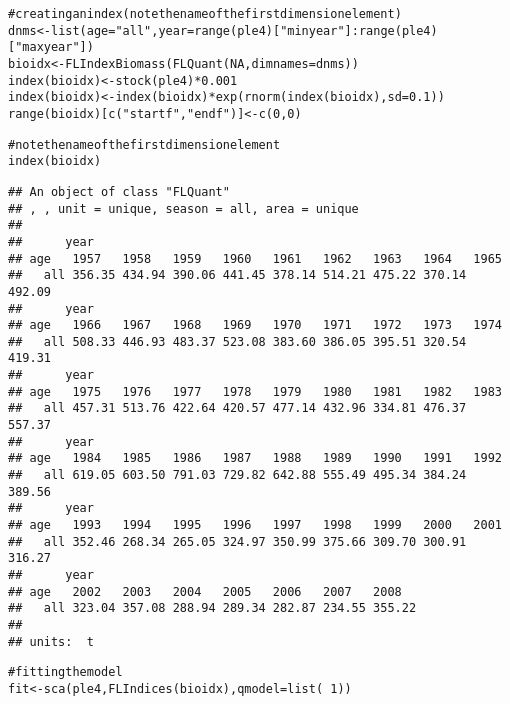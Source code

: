 \documentclass[a4paper,english,10pt]{article}\usepackage[]{graphicx}\usepackage[]{color}
\makeatletter
\newcommand{\hlnum}[1]{\textcolor[rgb]{0.2,0.2,0.2}{#1}}%
\newcommand{\hlstr}[1]{\textcolor[rgb]{0.2,0.2,0.2}{#1}}%
\newcommand{\hlcom}[1]{\textcolor[rgb]{0.2,0.267,0.4}{#1}}%
\newcommand{\hlopt}[1]{\textcolor[rgb]{0.2,0.2,0.2}{#1}}%
\newcommand{\hlstd}[1]{\textcolor[rgb]{0,0,0}{#1}}%
\newcommand{\hlkwb}[1]{\textcolor[rgb]{0.361,0.506,0.596}{#1}}%
\newcommand{\hlkwc}[1]{\textcolor[rgb]{0.361,0.506,0.596}{#1}}%
\newcommand{\hlkwd}[1]{\textcolor[rgb]{0.361,0.506,0.596}{#1}}%
\newenvironment{kframe}{%
 \def\at@end@of@kframe{}%
 \ifinner\ifhmode%
  \def\at@end@of@kframe{\end{minipage}}%
  \begin{minipage}{\columnwidth}%
 \fi\fi%
 \def\FrameCommand##1{\hskip\@totalleftmargin \hskip-\fboxsep
 \colorbox{shadecolor}{##1}\hskip-\fboxsep
     \hskip-\linewidth \hskip-\@totalleftmargin \hskip\columnwidth}%
 \MakeFramed {\advance\hsize-\width
   \@totalleftmargin\z@ \linewidth\hsize
   \@setminipage}}%
 {\par\unskip\endMakeFramed%
 \at@end@of@kframe}
\newenvironment{knitrout}{}{} %
\makeatother
\begin{document}
\begin{knitrout}
\color{fgcolor}\begin{kframe}
\begin{alltt}
\hlcom{# creating an index (note the name of the first dimension element)}
\hlstd{dnms} \hlkwb{<-} \hlkwd{list}\hlstd{(}\hlkwc{age}\hlstd{=}\hlstr{"all"}\hlstd{,} \hlkwc{year}\hlstd{=}\hlkwd{range}\hlstd{(ple4)[}\hlstr{"minyear"}\hlstd{]}\hlopt{:}\hlkwd{range}\hlstd{(ple4)[}\hlstr{"maxyear"}\hlstd{])}
\hlstd{bioidx} \hlkwb{<-} \hlkwd{FLIndexBiomass}\hlstd{(}\hlkwd{FLQuant}\hlstd{(}\hlnum{NA}\hlstd{,} \hlkwc{dimnames}\hlstd{=dnms))}
\hlkwd{index}\hlstd{(bioidx)} \hlkwb{<-} \hlkwd{stock}\hlstd{(ple4)}\hlopt{*}\hlnum{0.001}
\hlkwd{index}\hlstd{(bioidx)} \hlkwb{<-} \hlkwd{index}\hlstd{(bioidx)}\hlopt{*}\hlkwd{exp}\hlstd{(}\hlkwd{rnorm}\hlstd{(}\hlkwd{index}\hlstd{(bioidx),} \hlkwc{sd}\hlstd{=}\hlnum{0.1}\hlstd{))}
\hlkwd{range}\hlstd{(bioidx)[}\hlkwd{c}\hlstd{(}\hlstr{"startf"}\hlstd{,}\hlstr{"endf"}\hlstd{)]} \hlkwb{<-} \hlkwd{c}\hlstd{(}\hlnum{0}\hlstd{,}\hlnum{0}\hlstd{)}

\hlcom{# note the name of the first dimension element}
\hlkwd{index}\hlstd{(bioidx)}
\end{alltt}
\begin{verbatim}
## An object of class "FLQuant"
## , , unit = unique, season = all, area = unique
## 
##      year
## age   1957   1958   1959   1960   1961   1962   1963   1964   1965  
##   all 356.35 434.94 390.06 441.45 378.14 514.21 475.22 370.14 492.09
##      year
## age   1966   1967   1968   1969   1970   1971   1972   1973   1974  
##   all 508.33 446.93 483.37 523.08 383.60 386.05 395.51 320.54 419.31
##      year
## age   1975   1976   1977   1978   1979   1980   1981   1982   1983  
##   all 457.31 513.76 422.64 420.57 477.14 432.96 334.81 476.37 557.37
##      year
## age   1984   1985   1986   1987   1988   1989   1990   1991   1992  
##   all 619.05 603.50 791.03 729.82 642.88 555.49 495.34 384.24 389.56
##      year
## age   1993   1994   1995   1996   1997   1998   1999   2000   2001  
##   all 352.46 268.34 265.05 324.97 350.99 375.66 309.70 300.91 316.27
##      year
## age   2002   2003   2004   2005   2006   2007   2008  
##   all 323.04 357.08 288.94 289.34 282.87 234.55 355.22
## 
## units:  t
\end{verbatim}
\begin{alltt}
\hlcom{# fitting the model}
\hlstd{fit} \hlkwb{<-} \hlkwd{sca}\hlstd{(ple4,} \hlkwd{FLIndices}\hlstd{(bioidx),} \hlkwc{qmodel}\hlstd{=}\hlkwd{list}\hlstd{(}\hlopt{~}\hlnum{1}\hlstd{))}
\end{alltt}
\end{kframe}
\end{knitrout}
\end{document}
